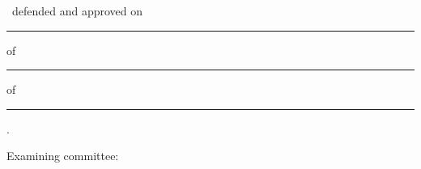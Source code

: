 
\begin{folhadeaprovacao}
  \begin{center}
    {\ABNTEXchapterfont\large\imprimirautor}

    \vspace*{\fill}
    {\ABNTEXchapterfont\bfseries\Large\imprimirtitulo}
    \vspace*{\fill}

    \hspace{.45\textwidth}
    \begin{minipage}{.5\textwidth}
        \imprimirpreambulo
    \end{minipage}
    \vspace*{\fill}
  \end{center}

  \begin{center}
    \imprimirtipotrabalho\ defended and approved on \rule{2cm}{0.4pt} of \rule{3cm}{0.4pt} of \rule{2cm}{0.4pt}.

    Examining committee:
  \end{center}


\end{folhadeaprovacao}
